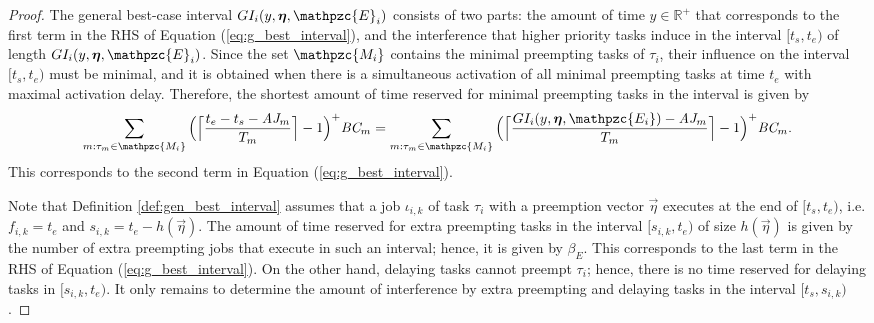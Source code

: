 \begin{proof}
	The general best-case interval $GI_i(y, \vec{\eta},\mathpzc{E}_i)$ consists of two parts: the amount of time $y\in \mathbb{R^+}$ that corresponds to the first term in the RHS of Equation (\ref{eq:g_best_interval}), and the interference that higher priority tasks induce in the interval $ [t_s,t_e) $ of length $GI_i(y, \vec{\eta},\mathpzc{E}_i)$. Since the set $\mathpzc{M_i}$ contains the minimal preempting tasks of $\tau_i$, their influence on the interval $[t_s,t_e)$ must be minimal, and it is obtained when there is a simultaneous activation of all minimal preempting tasks at time $t_e$ with maximal activation delay. Therefore, the shortest amount of time reserved for minimal preempting tasks in the interval is given by 
	\begin{align*}
	\sum\limits_{m:\tau_m \in \mathpzc{M_i}} \Big( \Big\lceil  \dfrac{t_e-t_s-\aj_m}{T_m}\Big\rceil -1 \Big)^+  \bc_m  = 	\sum\limits_{m:\tau_m \in \mathpzc{M_i}} \Big( \Big\lceil  \dfrac{GI_i(y, \vec{\eta},  \mathpzc{E_i})-\aj_m}{T_m}\Big\rceil -1 \Big)^+  \bc_m.
	\end{align*}
	This corresponds to the second term in Equation (\ref{eq:g_best_interval}).
	
	
	Note that Definition \ref{def:gen_best_interval} assumes that a job $\iota_{i,k}$ of task $\tau_i$ with a preemption vector $\vec{\eta}$ executes at the end of $[t_s,t_e)$, i.e. $f_{i,k}=t_e$ and $s_{i,k} = t_e - h(\vec{\eta})$. The amount of time reserved for extra preempting tasks in the interval $[s_{i,k},t_e)$ of size $h(\vec{\eta})$ is given by the number of extra preempting jobs that execute in such an interval; hence, it is given by $\beta_E$. This corresponds to the last term in the RHS of Equation (\ref{eq:g_best_interval}). On the other hand, delaying tasks cannot preempt $\tau_i$; hence, there is no time reserved for delaying tasks in $[s_{i,k},t_e)$. It only remains to determine the amount of interference by extra preempting and delaying tasks in the interval $[t_s,s_{i,k})$.
	

\end{proof}
